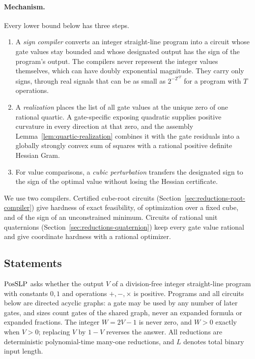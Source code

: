 \paragraph{Mechanism.}
Every lower bound below has three steps.
\begin{enumerate}[label=(\arabic*)]
\item A \emph{sign compiler} converts an integer straight-line program into a
circuit whose gate values stay bounded and whose designated output has the
sign of the program's output. The compilers never represent the integer
values themselves, which can have doubly exponential magnitude. They carry
only signs, through real signals that can be as small as $2^{-2^{cT}}$ for a
program with $T$ operations.
\item A \emph{realization} places the list of all gate values at the unique
zero of one rational quartic. A gate-specific exposing quadratic supplies
positive curvature in every direction at that zero, and the assembly
Lemma~\ref{lem:quartic-realization} combines it with the gate residuals into
a globally strongly convex sum of squares with a rational positive definite
Hessian Gram.
\item For value comparisons, a \emph{cubic perturbation} transfers the
designated sign to the sign of the optimal value without losing the Hessian
certificate.
\end{enumerate}
We use two compilers. Certified cube-root circuits
(Section~\ref{sec:reductions-root-compiler}) give hardness of exact
feasibility, of optimization over a fixed cube, and of the sign of an
unconstrained minimum. Circuits of rational unit quaternions
(Section~\ref{sec:reductions-quaternion}) keep every gate value rational and
give coordinate hardness with a rational optimizer.

\subsection{Statements}
\label{sec:reductions-statements}

$\mathrm{PosSLP}$ asks whether the output $V$ of a division-free integer
straight-line program with constants $0,1$ and operations $+,-,\times$ is
positive. Programs and all circuits below are directed acyclic graphs: a gate
may be used by any number of later gates, and sizes count gates of the shared
graph, never an expanded formula or expanded fractions. The integer $W=2V-1$
is never zero, and $W>0$ exactly when $V>0$; replacing $V$ by $1-V$ reverses
the answer. All reductions are deterministic polynomial-time many-one
reductions, and $L$ denotes total binary input length.

